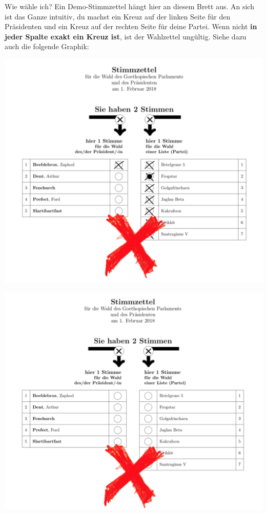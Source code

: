 \documentclass{sasbase}
\begin{document}
\begin{question}{Wie wähle ich?}
    Ein Demo-Stimmzettel hängt hier an diesem Brett aus. An sich ist das Ganze intuitiv, du machst ein Kreuz auf der linken Seite für
    den Präsidenten und ein Kreuz auf der rechten Seite für deine Partei. 
    Wenn nicht \textbf{in jeder Spalte exakt ein Kreuz ist}, ist der Wahlzettel ungültig.
    Siehe dazu auch die folgende Graphik:
    \begin{minipage}{0.5\linewidth}
    \includegraphics[width=\textwidth]{falsch_1.png}
    \end{minipage}
    \begin{minipage}{0.5\linewidth}
    \includegraphics[width=\textwidth]{falsch_2.png}

\end{minipage}
\end{question}
\end{document}
